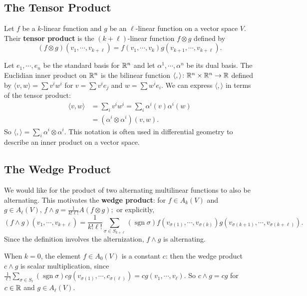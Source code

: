 \subsection{The Tensor Product}
Let $f$ be a $k$-linear function and $g$ be an $\ell$-linear function on a vector space $V$. Their \textbf{tensor product} is the $(k+\ell)$-linear function $f \otimes g$ defined by \[
    (f \otimes g)(v_1,\cdots ,v_{k+\ell})=f(v_1,\cdots ,v_k)g(v_{k+1},\cdots ,v_{k+\ell}).
\] 
\begin{example}
    Let $e_1,\cdots ,e_n $ be the standard basis for $\mathbb{R}^n $ and let $\alpha ^1,\cdots ,\alpha ^n $ be its dual basis. The Euclidian inner product on $\mathbb{R}^n $ is the bilinear function $\langle , \rangle  \colon \mathbb{R}^n  \times \mathbb{R}^n \to \mathbb{R}$ defined by $\langle v,w \rangle =\sum v^i w^i $ for $v=\sum v^i e_j $ and $w=\sum w^i e_i $. We can express $\langle , \rangle $ in terms of the tensor product: 
    \begin{align*}
        \langle v,w \rangle &=\sum_{i}^{} v^i w^i =\sum_i \alpha ^i (v)\alpha ^i (w)\\
                            &=(\alpha ^i \otimes \alpha ^i )(v,w).
    \end{align*}
    So $\langle , \rangle =\sum_i \alpha ^i \otimes \alpha ^i $. This notation is often used in differential geometry to describe an inner product on a vector space.
\end{example}
\subsection{The Wedge Product}
We would like for the product of two alternating multilinear functions to also be alternating. This motivates the \textbf{wedge product}: for $f\in A_k(V)$ and $g\in A_{\ell}(V)$, $f\wedge g = \frac{1}{k!\ell!}A(f\otimes g);$ or explicitly, \[
    (f\wedge g)(v_1,\cdots ,v_{k+\ell})=\frac{1}{k!\ell!}\sum_{\sigma\in S_{k+\ell}}(\operatorname{sgn}\sigma) f(v_{\sigma(1)},\cdots ,v_{\sigma(k)})g(v_{\sigma(k+1)},\cdots ,v_{\sigma(k+\ell)}).
\] Since the definition involves the alternization, $f\wedge g$ is alternating.

When $k=0$, the element $f\in A_0(V)$ is a constant $c$: then the wedge product $c\wedge g$ is scalar multiplication, since $\frac{1}{\ell!}\sum_{\sigma \in S_{\ell}}(\operatorname{sgn}\sigma)cg(v_{\sigma(1)},\cdots ,c_{\sigma(\ell)})=cg(v_1,\cdots ,v_{\ell})$. So $c\wedge g=cg$ for $c\in \mathbb{R}$ and $g\in A_{\ell}(V)$.

